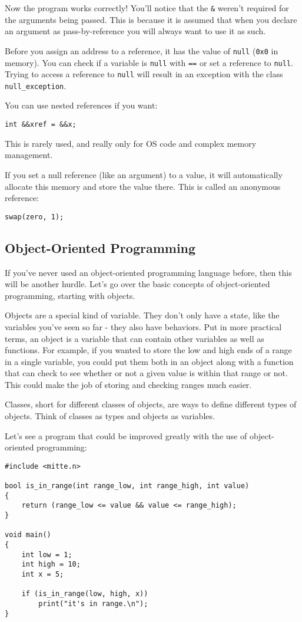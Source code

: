 \documentclass[10pt,a4paper]{article}
\begin{document}
Now the program works correctly! You'll notice that the \verb|&| weren't required for the arguments being passed. This is because it is assumed that when you declare an argument as pass-by-reference you will always want to use it as such.

Before you assign an address to a reference, it has the value of \verb|null| (\verb|0x0| in memory). You can check if a variable is \verb|null| with \verb|==| or set a reference to \verb|null|. Trying to access a reference to \verb|null| will result in an exception with the class \verb|null_exception|. 

You can use nested references if you want:
\begin{verbatim}
int &&xref = &&x;
\end{verbatim}

This is rarely used, and really only for OS code and complex memory management.

If you set a null reference (like an argument) to a value, it will automatically allocate this memory and store the value there. This is called an anonymous reference:
\begin{verbatim}
swap(zero, 1);
\end{verbatim}

\newpage




\subsection{Object-Oriented Programming}
If you've never used an object-oriented programming language before, then this will be another hurdle. Let's go over the basic concepts of object-oriented programming, starting with objects.

Objects are a special kind of variable. They don't only have a state, like the variables you've seen so far - they also have behaviors. Put in more practical terms, an object is a variable that can contain other variables as well as functions. For example, if you wanted to store the low and high ends of a range in a single variable, you could put them both in an object along with a function that can check to see whether or not a given value is within that range or not. This could make the job of storing and checking ranges much easier.

Classes, short for different classes of objects, are ways to define different types of objects. Think of classes as types and objects as variables. 

Let's see a program that could be improved greatly with the use of object-oriented programming:
\begin{verbatim}
#include <mitte.n>

bool is_in_range(int range_low, int range_high, int value)
{
    return (range_low <= value && value <= range_high);
}

void main()
{
    int low = 1;
    int high = 10;
    int x = 5;
    
    if (is_in_range(low, high, x))
        print("it's in range.\n");
}
\end{verbatim}
\end{document}
